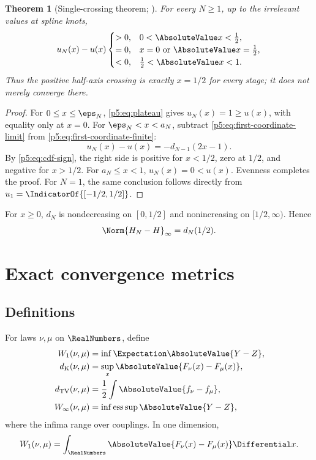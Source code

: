 \documentclass[11pt,oneside]{article}
\numberwithin{equation}{section}
\newtheorem{theorem}{Theorem}[section]
\theoremstyle{definition}
\theoremstyle{remark}
\begin{document}
\begin{theorem}[Single-crossing theorem; \newresult]
For every $N\ge1$, up to the irrelevant values at spline knots,
\begin{equation}
 u_N(x)-u(x)
 \begin{cases}
 >0,&0<\AbsoluteValue x<\tfrac12,\\
 =0,&x=0\text{ or }\AbsoluteValue x=\tfrac12,\\
 <0,&\tfrac12<\AbsoluteValue x<1.
 \end{cases}
 \label{p5:eq:single-crossing}
\end{equation}
Thus the positive half-axis crossing is exactly $x=1/2$ for every stage; it does not merely converge there.
\end{theorem}

\begin{proof}
For $0\le x\le\eps_N$, \eqref{p5:eq:plateau} gives $u_N(x)=1\ge u(x)$, with equality only at $x=0$.  For $\eps_N<x<a_N$, subtract \eqref{p5:eq:first-coordinate-limit} from \eqref{p5:eq:first-coordinate-finite}:
\begin{equation}
 u_N(x)-u(x)=-d_{N-1}(2x-1).
 \label{p5:eq:error-cdf-identity}
\end{equation}
By \eqref{p5:eq:cdf-sign}, the right side is positive for $x<1/2$, zero at $1/2$, and negative for $x>1/2$.  For $a_N\le x<1$, $u_N(x)=0<u(x)$.  Evenness completes the proof.  For $N=1$, the same conclusion follows directly from $u_1=\IndicatorOf{[-1/2,1/2]}$.
\end{proof}

\begin{corollary}
For $x\ge0$, $d_N$ is nondecreasing on $[0,1/2]$ and nonincreasing on $[1/2,\infty)$.  Hence
\begin{equation}
 \Norm{H_N-H}_{\infty}=d_N(1/2).
 \label{p5:eq:dk-at-half}
\end{equation}
\end{corollary}

\section{Exact convergence metrics}
\label{p5:sec:metrics}

\subsection{Definitions}

For laws $\nu,\mu$ on $\RealNumbers$, define
\begin{align}
 W_1(\nu,\mu)&=\inf\Expectation\AbsoluteValue{Y-Z},\\
 d_{\rm K}(\nu,\mu)&=\sup_x\AbsoluteValue{F_\nu(x)-F_\mu(x)},\\
 d_{\rm TV}(\nu,\mu)&=\frac12\int\AbsoluteValue{f_\nu-f_\mu},\\
 W_\infty(\nu,\mu)&=\inf\operatorname*{ess\,sup}\AbsoluteValue{Y-Z},
\end{align}
where the infima range over couplings.  In one dimension,
\begin{equation}
 W_1(\nu,\mu)=\int_{\RealNumbers}\AbsoluteValue{F_\nu(x)-F_\mu(x)}\Differential x.
 \label{p5:eq:w1-cdf}
\end{equation}
\end{document}
